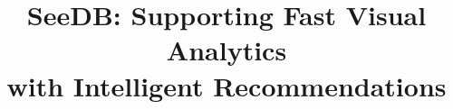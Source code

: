 \documentclass{sig-alternate}
\begin{document}
\newcommand{\reviewer}[1]{\textcolor{red}{Review: #1}}
\newcommand{\mpv}[1]{\textcolor{blue}{MV: #1}}
\newcommand{\agp}[1]{\textcolor{magenta}{AGP: #1}}
\newcommand{\SeeDB}{{\sc SeeDB}\xspace}
\newcommand{\calQ}{\mathcal{Q}}
\newcommand{\calR}{\mathcal{R}}
\newcommand{\att}[1]{{\text{#1}}}

\newcommand{\calA}{\mathcal{A}\xspace}
\newcommand{\calX}{\mathcal{X}\xspace}
\newcommand{\calY}{\mathcal{Y}\xspace}

\newcommand{\hc}{\hat{c}\xspace}
\newcommand{\htt}{\hat{t}\xspace}



\newtheorem{definition}{Definition}[section]
\newtheorem{example}[definition]{Example}
\newtheorem{problem}{Problem}[section]
\newtheorem{theorem}{Theorem}[section]
\newtheorem{lemma}{Lemma}[section]

\renewcommand{\baselinestretch}{0.995}



\makeatletter
\def\@copyrightspace{\relax}
\makeatother

\newcommand{\squishlist}{
   \begin{list}{$\bullet$}
    { \setlength{\itemsep}{0pt}
      \setlength{\parsep}{2pt}
      \setlength{\topsep}{0pt}
      \setlength{\partopsep}{0pt}
      \leftmargin=25pt
\rightmargin=0pt
\labelsep=5pt
\labelwidth=10pt
\itemindent=0pt
\listparindent=0pt
\itemsep=\parsep
    }
}
\newcommand{\squishend}{\end{list}}

\newenvironment{denselist}{
    \begin{list}{\small{$\bullet$}}%
    {\setlength{\itemsep}{0ex} \setlength{\topsep}{0ex}
    \setlength{\parsep}{0pt} \setlength{\itemindent}{0pt}
    \setlength{\leftmargin}{1.5em}
    \setlength{\partopsep}{0pt}}}%
    {\end{list}}


\newcommand{\eat}[1]{}
\newcommand{\papertext}[1]{#1}
\newcommand{\techreport}[1]{}

\newcommand{\techreporttext}[1]{}
\newcommand{\stitle}[1]{\vspace{0.25em}\noindent\textbf{#1}}

\newcommand{\srm}[1]{\textcolor{blue}{Sam: #1}}


\title{{\LARGE \sc SeeDB}: Supporting Fast Visual Analytics \\ with Intelligent Recommendations}
\end{document}
